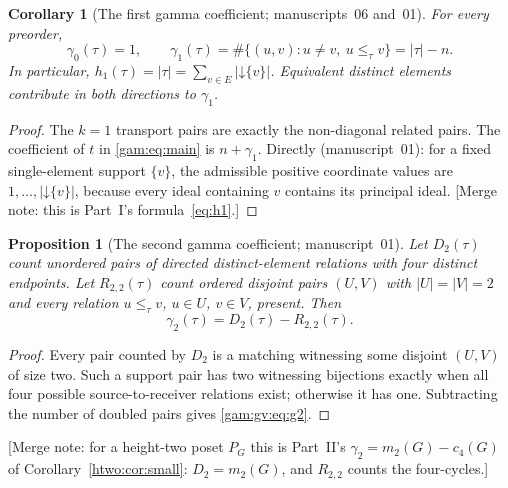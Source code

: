 \documentclass[11pt]{article}
\numberwithin{equation}{section}
\newtheorem{proposition}[theorem]{Proposition}
\newtheorem{corollary}[theorem]{Corollary}
\theoremstyle{definition}
\newcommand{\down}{\mathord\downarrow}
\begin{document}
\begin{corollary}[The first gamma coefficient; manuscripts~06 and~01]\label{gam:cor:gammaone}
For every preorder,
\begin{equation}
 \gamma_0(\tau)=1,\qquad
 \gamma_1(\tau)=\#\{(u,v):u\ne v,\ u\le_\tau v\}=|\tau|-n.
 \label{gam:eq:gammaone}
\end{equation}
In particular, $h_1(\tau)=|\tau|=\sum_{v\in E}|\down\{v\}|$. Equivalent
distinct elements contribute in both directions to $\gamma_1$.
\end{corollary}
\begin{proof}
The $k=1$ transport pairs are exactly the non-diagonal related pairs. The
coefficient of $t$ in \eqref{gam:eq:main} is $n+\gamma_1$. Directly
(manuscript~01): for a fixed single-element support $\{v\}$, the admissible
positive coordinate values are $1,\ldots,|\down\{v\}|$, because every ideal
containing $v$ contains its principal ideal. [Merge note: this is Part~I's
formula~\eqref{eq:h1}.]
\end{proof}

\begin{proposition}[The second gamma coefficient; manuscript~01]\label{gam:gv:prop:low}
Let $D_2(\tau)$ count unordered pairs of directed distinct-element relations
with four distinct endpoints. Let $R_{2,2}(\tau)$ count ordered disjoint pairs
$(U,V)$ with $|U|=|V|=2$ and every relation $u\le_\tau v$, $u\in U$, $v\in V$,
present. Then
\begin{equation}
 \gamma_2(\tau)=D_2(\tau)-R_{2,2}(\tau).
 \label{gam:gv:eq:g2}
\end{equation}
\end{proposition}
\begin{proof}
Every pair counted by $D_2$ is a matching witnessing some disjoint
$(U,V)$ of size two. Such a support pair has two witnessing bijections
exactly when all four possible source-to-receiver relations exist; otherwise
it has one. Subtracting the number of doubled pairs gives \eqref{gam:gv:eq:g2}.
\end{proof}
[Merge note: for a height-two poset $P_G$ this is Part~II's
$\gamma_2=m_2(G)-c_4(G)$ of Corollary~\ref{htwo:cor:small}: $D_2=m_2(G)$, and
$R_{2,2}$ counts the four-cycles.]
\end{document}
